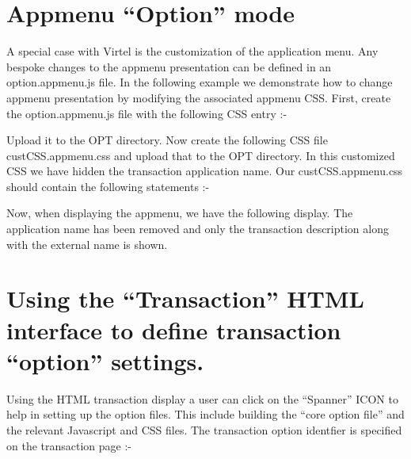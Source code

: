 \documentclass[letterpaper,10pt,english]{sphinxmanual}
\begin{document}
\section{Appmenu “Option” mode}
\label{\detokenize{TN202002:appmenu-option-mode}}
A special case with Virtel is the customization of the application menu. Any bespoke changes to the appmenu presentation can be defined in an option.appmenu.js file. In the following example we demonstrate how to change appmenu presentation by modifying the associated appmenu CSS. First, create the option.appmenu.js file with the following CSS entry :-

\begin{sphinxVerbatim}[commandchars=\\\{\}]
   
 
\end{sphinxVerbatim}

Upload it to the OPT directory. Now create the following CSS file custCSS.appmenu.css and upload that to the OPT directory. In this customized CSS we have hidden the transaction application name. Our custCSS.appmenu.css should contain the following statements :-

\begin{sphinxVerbatim}[commandchars=\\\{\}]
       
\end{sphinxVerbatim}

Now, when displaying the appmenu, we have the following display. The application name has been removed and only the transaction description along with the external name is shown.



\section{Using the “Transaction” HTML interface to define transaction “option” settings.}
\label{\detokenize{TN202002:using-the-transaction-html-interface-to-define-transaction-option-settings}}
Using the HTML transaction display a user can click on the “Spanner” ICON to help in setting up the option files. This include building the “core option file” and the relevant Javascript and CSS files. The transaction option identfier is specified on the transaction page :-
\end{document}
